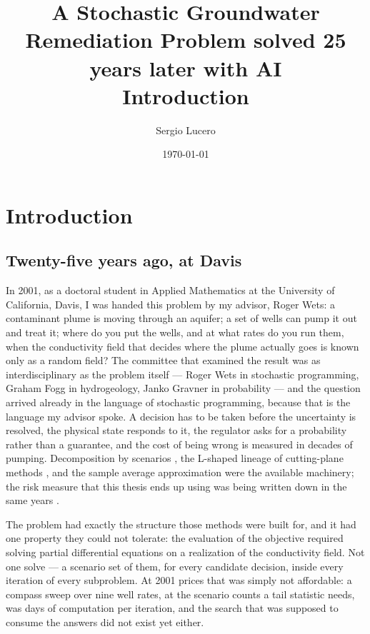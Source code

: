 \documentclass[11pt]{article}
\title{A Stochastic Groundwater Remediation Problem solved 25 years later with AI\\
\large Introduction}
\author{Sergio Lucero}
\date{\today}
\begin{document}
\maketitle

\section{Introduction}
\subsection{Twenty-five years ago, at Davis}

In 2001, as a doctoral student in Applied Mathematics at the University of
California, Davis, I was handed this problem by my advisor, Roger Wets: a
contaminant plume is moving through an aquifer; a set of wells can pump it out and
treat it; where do you put the wells, and at what rates do you run them, when the
conductivity field that decides where the plume actually goes is known only as a
random field? The committee that examined the result was as interdisciplinary as
the problem itself --- Roger Wets in stochastic programming, Graham Fogg in
hydrogeology, Janko Gravner in probability --- and the question arrived already in
the language of stochastic programming, because that is the language my advisor
spoke. A decision has to be taken before the uncertainty is resolved, the physical
state responds to it, the regulator asks for a probability rather than a
guarantee, and the cost of being wrong is measured in decades of pumping.
Decomposition by scenarios \citep{rockafellar1991}, the L-shaped lineage of
cutting-plane methods \citep{vanslyke1969,benders1962}, and the sample average
approximation \citep{kleywegt2002} were the available machinery; the risk measure
that this thesis ends up using was being written down in the same years
\citep{rockafellar2000}.

The problem had exactly the structure those methods were built for, and it had
one property they could not tolerate: the evaluation of the objective required
solving partial differential equations on a realization of the conductivity
field. Not one solve --- a scenario set of them, for every candidate decision,
inside every iteration of every subproblem. At 2001 prices that was simply not
affordable: a compass sweep over nine well rates, at the scenario counts a tail
statistic needs, was days of computation per iteration, and the search that was
supposed to consume the answers did not exist yet either.
\end{document}
